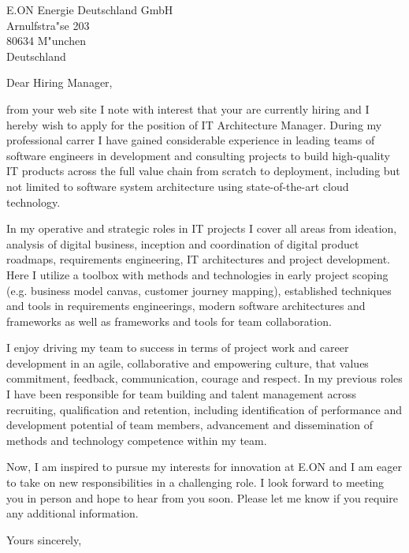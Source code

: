 \documentclass[10pt,a4paper]{dinbrief}
\date{\today}
\begin{document}
 
\begin{letter}  
{%
	E.ON Energie Deutschland GmbH\\
	Arnulfstra"se 203\\
	80634 M"unchen\\
	Deutschland	
}
\subject{\bf Job Application IT Architecture Manager}
\opening{Dear Hiring Manager,}

from your web site I note with interest that your are currently hiring and I hereby wish to apply for the position of IT Architecture Manager. During my professional carrer I have gained considerable experience in leading teams of software engineers in development and consulting projects to build high-quality IT products across the full value chain from scratch to deployment, including but not limited to software system architecture using state-of-the-art cloud technology. 

In my operative and strategic roles in IT projects I cover all areas from ideation, analysis of digital business, inception and coordination of digital product roadmaps, requirements engineering, IT architectures and project development. Here I utilize a toolbox with methods and technologies in early project scoping (e.g. business model canvas, customer journey mapping), established techniques and tools in requirements engineerings, modern software architectures and frameworks as well as frameworks and tools for team collaboration.

I enjoy driving my team to success in terms of project work and career development in an agile, collaborative and empowering culture, that values commitment, feedback, communication, courage and respect. In my previous roles I have been responsible for team building and talent management across recruiting, qualification and retention, including identification of performance and development potential of team members, advancement and dissemination of methods and technology competence within my team.

Now, I am inspired to pursue my interests for innovation at E.ON and I am eager to take on new responsibilities in a challenging role. I look forward to meeting you in person and hope to hear from you soon. Please let me know if you require any additional information.

\closing{Yours sincerely,}
\end{letter}
\end{document}
